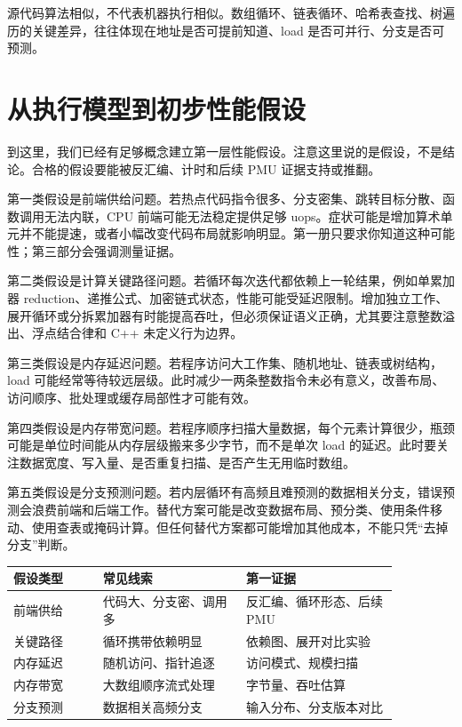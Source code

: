\begin{mentalmodel}
源代码算法相似，不代表机器执行相似。数组循环、链表循环、哈希表查找、树遍历的关键差异，往往体现在地址是否可提前知道、load 是否可并行、分支是否可预测。
\end{mentalmodel}

\section{从执行模型到初步性能假设}

到这里，我们已经有足够概念建立第一层性能假设。注意这里说的是假设，不是结论。合格的假设要能被反汇编、计时和后续 PMU 证据支持或推翻。

第一类假设是前端供给问题。若热点代码指令很多、分支密集、跳转目标分散、函数调用无法内联，CPU 前端可能无法稳定提供足够 uops。症状可能是增加算术单元并不能提速，或者小幅改变代码布局就影响明显。第一册只要求你知道这种可能性；第三部分会强调测量证据。

第二类假设是计算关键路径问题。若循环每次迭代都依赖上一轮结果，例如单累加器 reduction、递推公式、加密链式状态，性能可能受延迟限制。增加独立工作、展开循环或分拆累加器有时能提高吞吐，但必须保证语义正确，尤其要注意整数溢出、浮点结合律和 C++ 未定义行为边界。

第三类假设是内存延迟问题。若程序访问大工作集、随机地址、链表或树结构，load 可能经常等待较远层级。此时减少一两条整数指令未必有意义，改善布局、访问顺序、批处理或缓存局部性才可能有效。

第四类假设是内存带宽问题。若程序顺序扫描大量数据，每个元素计算很少，瓶颈可能是单位时间能从内存层级搬来多少字节，而不是单次 load 的延迟。此时要关注数据宽度、写入量、是否重复扫描、是否产生无用临时数组。

第五类假设是分支预测问题。若内层循环有高频且难预测的数据相关分支，错误预测会浪费前端和后端工作。替代方案可能是改变数据布局、预分类、使用条件移动、使用查表或掩码计算。但任何替代方案都可能增加其他成本，不能只凭“去掉分支”判断。

\begin{center}
\begin{tabular}{p{0.20\linewidth}p{0.32\linewidth}p{0.34\linewidth}}
\toprule
假设类型 & 常见线索 & 第一证据 \\
\midrule
前端供给 & 代码大、分支密、调用多 & 反汇编、循环形态、后续 PMU \\
关键路径 & 循环携带依赖明显 & 依赖图、展开对比实验 \\
内存延迟 & 随机访问、指针追逐 & 访问模式、规模扫描 \\
内存带宽 & 大数组顺序流式处理 & 字节量、吞吐估算 \\
分支预测 & 数据相关高频分支 & 输入分布、分支版本对比 \\
\bottomrule
\end{tabular}
\end{center}


